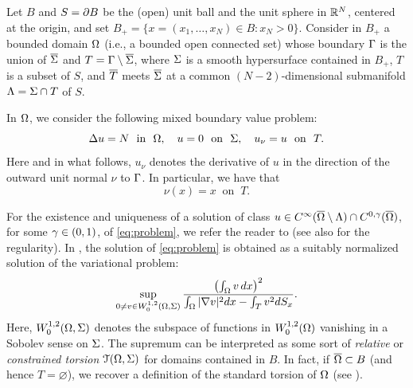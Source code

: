\documentclass[a4paper,10pt]{amsart}
\numberwithin{equation}{section}
\begin{document}
Let $B$ and $S=\partial B$ be the (open) unit ball and the unit sphere in $\mathbb{R}^N$, centered at the origin, and set $B_+=\{ x=(x_1,\dots, x_N)\in B : x_N>0\}$. Consider in $B_+$
a bounded domain $\Omega$ (i.e., a bounded open connected set) whose boundary $\Gamma$
is the union of $\overline{\Sigma}$ and $T= \Gamma \setminus \overline{\Sigma}$, where $\Sigma$ is a smooth hypersurface contained in $B_+$, $T$ is a subset of $S$, and $\overline{T}$ meets $\overline{\Sigma}$ at a common $(N-2)$-dimensional submanifold $\Lambda=\Sigma\cap T$ of $S$.
\par
In $\Omega$, we consider the following mixed
boundary value problem:
\begin{equation}
\label{eq:problem}
\Delta u = N \ \text{  in  } \ \Omega, \quad u=0 \ \text{  on  } \ \Sigma , \quad u_{\nu} = u \ \text{  on  } \ T.
\end{equation}
Here and in what follows,  $u_\nu$ denotes the derivative of $u$ in the direction of  the outward unit normal $\nu$ to $\Gamma$. In particular, we have that
\begin{equation*}
\nu(x)=x \ \text{ on } \ T.
\end{equation*}

For the existence and uniqueness of a solution of class $u \in C^\infty ( \overline{\Omega} \setminus \Lambda) \cap C^{0, \gamma} (\overline{\Omega})$, for some $\gamma \in (0,1)$, of \eqref{eq:problem}, we refer the reader to \cite[Proposition 2.2]{GX} (see also \cite{Li} for the regularity).
In \cite{GX}, the solution of \eqref{eq:problem} is obtained as a suitably normalized solution of the variational problem:
$$
\sup_{0\ne v\in W^{1,2}_0(\Omega, \Sigma)}\frac{\left(\int_\Omega v\,dx\right)^2}{\int_\Omega |\nabla v|^2 dx-\int_T v^2 dS_x}.
$$
Here, $W^{1,2}_0(\Omega, \Sigma)$ denotes the subspace of functions in $W^{1,2}_0(\Omega)$ vanishing %
in a Sobolev sense on $\Sigma$. The supremum can be interpreted as some sort of \textit{relative} or \textit{constrained torsion} ${\mathcal T}(\Omega,\Sigma)$ for domains contained in $B$. In fact, if $\overline{\Omega}\subset B$ (and hence $T=\varnothing$), we recover a definition of the standard torsion of $\Omega$ (see \cite{Ma}).  
 
\end{document}
